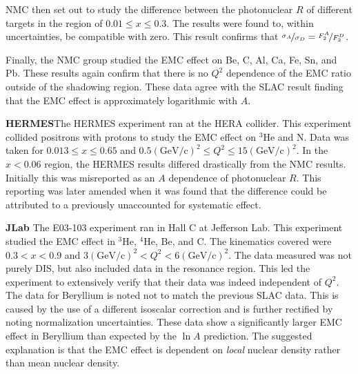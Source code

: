 NMC then set out to study the difference between the photonuclear $R$ of different targets in the region of $0.01 \leq x \leq 0.3$. The results were found to, within uncertainties, be compatible with zero. This result confirms that $\nicefrac{\sigma_A}{\sigma_D}=\nicefrac{F_2^A}{F_2^D}$.

Finally, the NMC group studied the EMC effect on Be, C, Al, Ca, Fe, Sn, and Pb. These results again confirm that there is no $Q^2$ dependence of the EMC ratio outside of the shadowing region. These data agree with the SLAC result finding that the EMC effect is approximately logarithmic with $A$.


\textbf{HERMES}The HERMES experiment ran at the HERA collider. This experiment collided positrons with protons to study the EMC effect on $^3$He and N. Data was taken for $0.013 \le x \le 0.65$ and $0.5 \left(\textrm{GeV/c}\right)^2 \le Q^2 \le 15 \left(\textrm{GeV/c}\right)^2$. In the $x<0.06$ region, the HERMES results differed drastically from the NMC results. Initially this was misreported as an $A$ dependence of photonuclear $R$. This reporting was later amended when it was found that the difference could be attributed to a previously unaccounted for systematic effect.

\textbf{JLab} The E03-103 experiment ran in Hall C at Jefferson Lab. This experiment studied the EMC effect in $^3$He, $^4$He, Be, and C. The kinematics covered were $0.3 < x < 0.9$ and $3 \left(\textrm{GeV/c}\right)^2 < Q^2 < 6 \left(\textrm{GeV/c}\right)^2$. The data measured was not purely DIS, but also included data in the resonance region. This led the experiment to extensively verify that their data was indeed independent of $Q^2$. The data for Beryllium is noted not to match the previous SLAC data. This is caused by the use of a different isoscalar correction and is further rectified by noting normalization uncertainties. These data show a significantly larger EMC effect in Beryllium than expected by the $\ln A$ prediction. The suggested explanation is that the EMC effect is dependent on \textit{local} nuclear density rather than mean nuclear density.